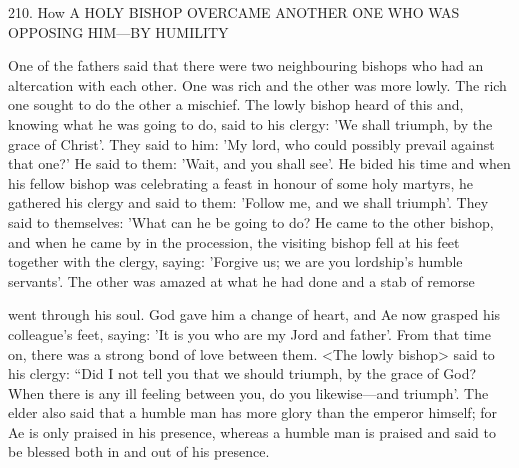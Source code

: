 210. How A HOLY BISHOP OVERCAME ANOTHER ONE
WHO WAS OPPOSING HIM—BY HUMILITY

One of the fathers said that there were two neighbouring bishops
who had an altercation with each other. One was rich and the other
was more lowly. The rich one sought to do the other a mischief.
The lowly bishop heard of this and, knowing what he was going to
do, said to his clergy: 'We shall triumph, by the grace of Christ'.
They said to him: 'My lord, who could possibly prevail against that
one?' He said to them: 'Wait, and you shall see'. He bided his time
and when his fellow bishop was celebrating a feast in honour of
some holy martyrs, he gathered his clergy and said to them: 'Follow
me, and we shall triumph'. They said to themselves: 'What can he
be going to do? He came to the other bishop, and when he came by
in the procession, the visiting bishop fell at his feet together with the
clergy, saying: 'Forgive us; we are you lordship's humble servants'.
The other was amazed at what he had done and a stab of remorse

went through his soul. God gave him a change of heart, and Ae now
grasped his colleague's feet, saying: 'It is you who are my Jord and
father'. From that time on, there was a strong bond of love between
them. <The lowly bishop> said to his clergy: “Did I not tell you that
we should triumph, by the grace of God? When there is any ill
feeling between you, do you likewise—and triumph'. The elder also
said that a humble man has more glory than the emperor himself;
for Ae is only praised in his presence, whereas a humble man is
praised and said to be blessed both in and out of his presence.

